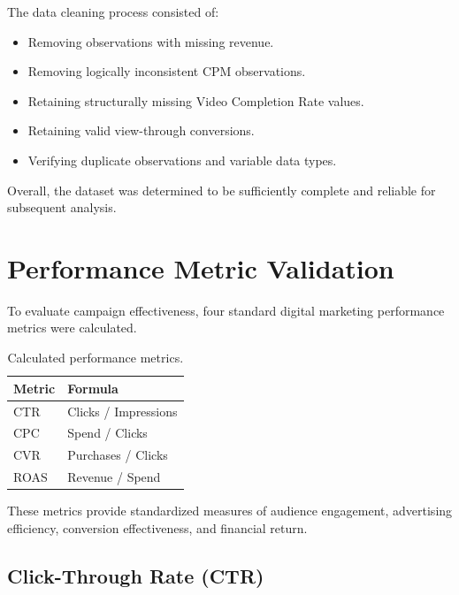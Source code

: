 \documentclass[11pt]{article}
\begin{document}
	The data cleaning process consisted of:
	
	\begin{itemize}
		
		\item Removing observations with missing revenue.
		
		\item Removing logically inconsistent CPM observations.
		
		\item Retaining structurally missing Video Completion Rate values.
		
		\item Retaining valid view-through conversions.
		
		\item Verifying duplicate observations and variable data types.
		
	\end{itemize}
	
	Overall, the dataset was determined to be sufficiently complete and reliable for subsequent analysis.
	
	\section{Performance Metric Validation}
	
	To evaluate campaign effectiveness, four standard digital marketing performance metrics were calculated.
	
	\begin{table}[H]
		\centering
		\begin{tabular}{ll}
			\toprule
			Metric & Formula\\
			\midrule
			CTR & Clicks / Impressions\\
			CPC & Spend / Clicks\\
			CVR & Purchases / Clicks\\
			ROAS & Revenue / Spend\\
			\bottomrule
		\end{tabular}
		\caption{Calculated performance metrics.}
	\end{table}
	
	These metrics provide standardized measures of audience engagement, advertising efficiency, conversion effectiveness, and financial return.
	
	\subsection*{Click-Through Rate (CTR)}
	
\end{document}
